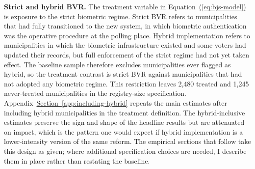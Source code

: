 \textbf{Strict and hybrid BVR.} The treatment variable in Equation~\hyperref[eq:bjs-model]{(\ref*{eq:bjs-model})} is exposure to the strict biometric regime. Strict BVR refers to municipalities that had fully transitioned to the new system, in which biometric authentication was the operative procedure at the polling place. Hybrid implementation refers to municipalities in which the biometric infrastructure existed and some voters had updated their records, but full enforcement of the strict regime had not yet taken effect. The baseline sample therefore excludes municipalities ever flagged as hybrid, so the treatment contrast is strict BVR against municipalities that had not adopted any biometric regime. This restriction leaves 2{,}480 treated and 1{,}245 never-treated municipalities in the registry-size specification. Appendix~\hyperref[app:including-hybrid]{Section~\ref*{app:including-hybrid}} repeats the main estimates after including hybrid municipalities in the treatment definition. The hybrid-inclusive estimates preserve the sign and shape of the headline results but are attenuated on impact, which is the pattern one would expect if hybrid implementation is a lower-intensity version of the same reform. The empirical sections that follow take this design as given; where additional specification choices are needed, I describe them in place rather than restating the baseline.
